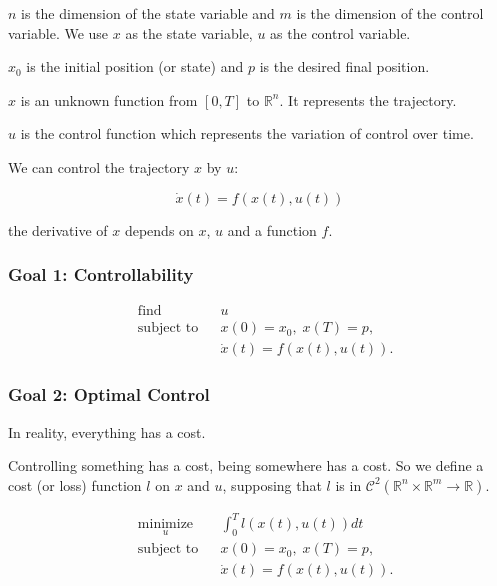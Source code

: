 \documentclass{report}
\begin{document}
$n$ is the dimension of the state variable and $m$ is the dimension of the control variable. We use $x$ as the state variable, $u$ as the control variable.

$x_0$ is the initial position (or state) and $p$ is the desired final position.

$x$ is an unknown function from $[0, T]$ to $\mathbb{R}^n$. It represents the trajectory.

$u$ is the control function which represents the variation of control over time.

We can control the trajectory $x$ by $u$: 

\begin{equation}
\dot{x} (t) = f(x(t), u(t))
\end{equation}

the derivative of $x$ depends on $x$, $u$ and a function $f$. 



\subsubsection{Goal 1: Controllability}

\begin{equation}
\begin{aligned}
& {\text{find}}
& & u \\
& \text{subject to}
& & x(0) = x_0, \; x(T) = p, \\
&&& \dot{x} (t) = f(x(t), u(t)).
\end{aligned}
\end{equation}

\subsubsection{Goal 2: Optimal Control}
In reality, everything has a cost.

Controlling something has a cost, being somewhere has a cost. So we define a cost (or loss) function $l$ on $x$ and $u$, supposing that $l$ is in $\mathscr{C}^2(\mathbb{R}^n \times \mathbb{R}^m \to \mathbb{R})$.
 

\begin{equation}
\begin{aligned}
& \underset{u}{\text{minimize}}
& & \int_0^T l(x(t),u(t)) dt \\
& \text{subject to}
& & x(0) = x_0, \; x(T) = p, \\
&&& \dot{x} (t) = f(x(t), u(t)).
\end{aligned}
\end{equation}
\end{document}
